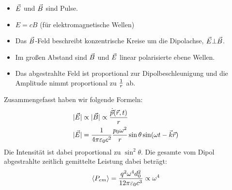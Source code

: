 
\begin{itemize}
\item $\vec{E}$ und $\vec{B}$ sind Pulse.
\item $E=cB$ (für elektromagnetische Wellen)
\item Das $\vec{B}$-Feld beschreibt konzentrische Kreise um die
  Dipolachse, $\vec{E}\bot\vec{B}$.
\item Im großen Abstand sind $\vec{B}$ und $\vec{E}$ linear
  polarisierte ebene Wellen.
\item Das abgestrahlte Feld ist proportional zur
  Dipolbeschleunigung und die Amplitude nimmt proportional zu
  $\frac{1}{r}$ ab.
\end{itemize}
Zusammengefasst haben wir folgende Formeln:
\begin{align*}
  \vert \vec{E}\vert
  &\propto\vert\vec{B}\vert\propto\frac{\dot{\vec{p}}(\vec{r},t)}{r}\\
  \vert\vec{E}\vert
  &=\frac{1}{4\pi\varepsilon_0 c^2} \frac{p_0\omega^2}{r}
    \sin\theta \sin(\omega t-\vec{k}\vec{r})
\end{align*}
Die Intensität ist dabei proportional zu $\sin^2\theta$. Die gesamte vom Dipol
abgestrahlte zeitlich gemittelte Leistung dabei beträgt: 
\begin{align*}
  \langle P_{em}\rangle
  =\frac{q^2\omega^4 d_0^2}{12\pi\varepsilon_0 c^3}
  \propto\omega^4 
\end{align*}


